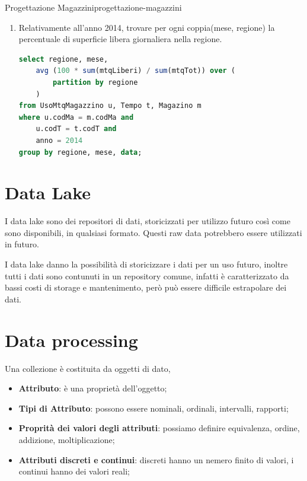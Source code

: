 \documentclass[12pt]{article}
\begin{document}
\begin{problem}{Progettazione Magazzini}{progettazione-magazzini}
\begin{enumerate}
\begin{lstlisting}[language=sql]
from UsoProdMagazzino u, Tempo t, Magazzino m
where u.codMa = m.codMa and
    u.codT = t.codT and
    anno = 2015
group by regione, mese, data;
\end{lstlisting}
        \item Relativamente all’anno 2014, trovare per ogni coppia(mese, regione) la percentuale di superficie libera giornaliera nella regione.
\begin{lstlisting}[language=sql]
select regione, mese,
    avg (100 * sum(mtqLiberi) / sum(mtqTot)) over (
        partition by regione
    )
from UsoMtqMagazzino u, Tempo t, Magazino m
where u.codMa = m.codMa and
    u.codT = t.codT and
    anno = 2014
group by regione, mese, data;
\end{lstlisting}
    \end{enumerate}
\end{problem}




\section{Data Lake}
I data lake sono dei repositori di dati, storicizzati per utilizzo futuro cos\`i come sono disponibili, in qualsiasi formato. Questi raw data potrebbero essere utilizzati in futuro.

I data lake danno la possibilit\`a di storicizzare i dati per un uso futuro, inoltre tutti i dati sono contunuti in un repository comune, infatti \`e caratterizzato da bassi costi di storage e mantenimento, per\`o pu\`o essere difficile estrapolare dei dati.

\newpage
\section{Data processing}
Una collezione \`e costituita da oggetti di dato,
\begin{itemize}
    \item \textbf{Attributo}: \`e una propriet\`a dell'oggetto;
    \item \textbf{Tipi di Attributo}: possono essere nominali, ordinali, intervalli, rapporti;
    \item \textbf{Proprit\`a dei valori degli attributi}: possiamo definire equivalenza, ordine, addizione, moltiplicazione;
    \item \textbf{Attributi discreti e continui}:  discreti hanno un nemero finito di valori, i continui hanno dei valori reali;
\end{itemize}
\end{document}
